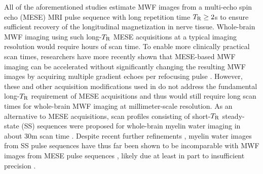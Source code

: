 All of the aforementioned studies
estimate MWF images
from a multi-echo spin echo (MESE) MRI pulse sequence
\cite{carr:54:eod}
with long repetition time $T_\mathrm{R}\geq2$s
to ensure sufficient recovery
of the longitudinal magnetization 
in nerve tissue.
Whole-brain MWF imaging 
using such long-$T_\mathrm{R}$ MESE acquisitions
at a typical imaging resolution
would require hours of scan time.
To enable more clinically practical scan times,
researchers have more recently shown
that MESE-based MWF imaging
can be accelerated
without significantly changing
the resulting MWF images \cite{does:00:rat,prasloski:12:rwc}
by acquiring multiple gradient echoes
per refocusing pulse \cite{feinberg:91:gga}.
However, 
these and other acquisition modifications
used in \cite{prasloski:12:rwc}
do not address the fundamental long-$T_\mathrm{R}$ requirement
of MESE acquisitions
and thus would still require long scan times
for whole-brain MWF imaging
at millimeter-scale resolution.
%
As an alternative to MESE acquisitions,
scan profiles consisting of short-$T_\mathrm{R}$ steady-state (SS) sequences
were proposed 
for whole-brain myelin water imaging in about 30m scan time
\cite{deoni:08:gmt}.
Despite recent further refinements
\cite{deoni:11:com, deoni:13:oct},
myelin water images from SS pulse sequences 
have thus far been shown
to be incomparable with MWF images
from MESE pulse sequences
\cite{zhang:15:com},
likely due at least in part
to insufficient precision \cite{lankford:13:oti}.

